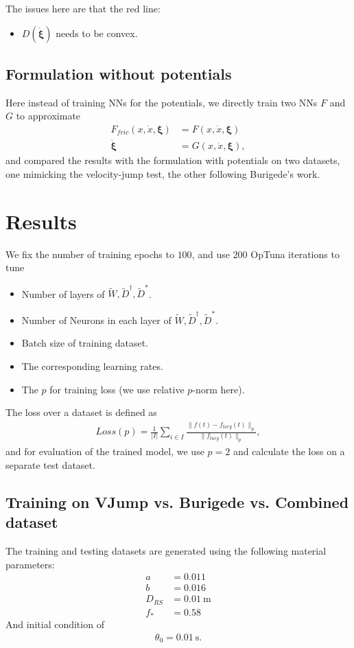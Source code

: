 \noindent The issues here are that the red line:
\begin{itemize}
    \item $D(\dot{\bm{\xi}})$ needs to be convex. 
\end{itemize}

\subsection{Formulation without potentials}
\noindent Here instead of training NNs for the potentials, 
we directly train two NNs $F$ and $G$ to approximate
\begin{align}
    F_{fric}(x, \dot{x}, \bm{\xi}) &= F(x, \dot{x}, \bm{\xi}) \label{eq:FFriction} \\
    \dot{\bm{\xi}} &= G(x, \dot{x}, \bm{\xi}) \label{eq:GforXi}, 
\end{align}
and compared the results with the formulation with potentials on two datasets, 
one mimicking the velocity-jump test, 
the other following Burigede's work. 

\newpage
\section{Results}
\noindent We fix the number of training epochs to $100$, 
and use $200$ OpTuna iterations to tune
\begin{itemize}
    \item Number of layers of $\tilde{W}, \tilde{D}^\dagger, \tilde{D}^*$.
    \item Number of Neurons in each layer of $\tilde{W}, \tilde{D}^\dagger, \tilde{D}^*$.
    \item Batch size of training dataset.
    \item The corresponding learning rates.
    \item The $p$ for training loss (we use relative $p$-norm here). 
\end{itemize}
The loss over a dataset is defined as 
\begin{align}
    Loss(p) = \frac{1}{|I|} \sum_{i\in I} \frac{\|f(t)-f_{targ}(t)\|_p}{\|f_{targ}(t)\|_p}, 
\end{align}
and for evaluation of the trained model, 
we use $p=2$ and calculate the loss on a separate test dataset. 

\subsection{Training on VJump vs. Burigede vs. Combined dataset}
The training and testing datasets are generated using the following material parameters:
\begin{align*}
    a &= 0.011 \\
    b &= 0.016 \\
    D_{RS} &= 0.01\ \mathrm{m}\\
    f_* &= 0.58
\end{align*}
And initial condition of 
\begin{align*}
    \theta_0 = 0.01\ \mathrm{s}.
\end{align*}

